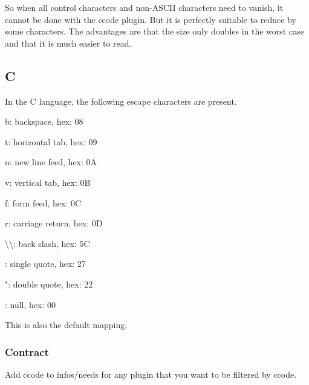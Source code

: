 So when all control characters and non-\/\+A\+S\+C\+II characters need to vanish, it cannot be done with the ccode plugin. But it is perfectly suitable to reduce by some characters. The advantages are that the size only doubles in the worst case and that it is much easier to read.\hypertarget{autotoc_md78_autotoc_md84}{}\subsection{C}\label{autotoc_md78_autotoc_md84}
In the C language, the following escape characters are present.


\begin{DoxyItemize}
\item {\ttfamily b}\+: backspace, hex\+: 08
\item {\ttfamily t}\+: horizontal tab, hex\+: 09
\item {\ttfamily n}\+: new line feed, hex\+: 0A
\item {\ttfamily v}\+: vertical tab, hex\+: 0B
\item {\ttfamily f}\+: form feed, hex\+: 0C
\item {\ttfamily r}\+: carriage return, hex\+: 0D
\item {\ttfamily \textbackslash{}\textbackslash{}}\+: back slash, hex\+: 5C
\item {\ttfamily \textquotesingle{}}\+: single quote, hex\+: 27
\item {\ttfamily "}\+: double quote, hex\+: 22
\item {}\+: null, hex\+: 00
\end{DoxyItemize}

This is also the default mapping.\hypertarget{autotoc_md78_autotoc_md85}{}\subsubsection{Contract}\label{autotoc_md78_autotoc_md85}
Add {\ttfamily ccode} to {\ttfamily infos/needs} for any plugin that you want to be filtered by ccode. 